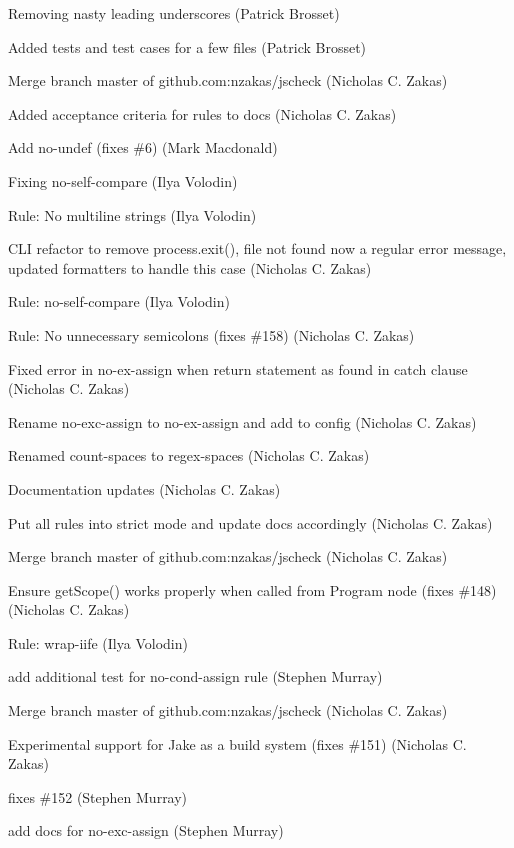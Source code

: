 \begin{DoxyItemize}
\item Removing nasty leading underscores (Patrick Brosset)
\item Added tests and test cases for a few files (Patrick Brosset)
\item Merge branch \textquotesingle{}master\textquotesingle{} of github.\+com\+:nzakas/jscheck (Nicholas C. Zakas)
\item Added acceptance criteria for rules to docs (Nicholas C. Zakas)
\item Add no-\/undef (fixes \#6) (Mark Macdonald)
\item Fixing no-\/self-\/compare (Ilya Volodin)
\item Rule\+: No multiline strings (Ilya Volodin)
\item C\+LI refactor to remove process.\+exit(), file not found now a regular error message, updated formatters to handle this case (Nicholas C. Zakas)
\item Rule\+: no-\/self-\/compare (Ilya Volodin)
\item Rule\+: No unnecessary semicolons (fixes \#158) (Nicholas C. Zakas)
\item Fixed error in no-\/ex-\/assign when return statement as found in catch clause (Nicholas C. Zakas)
\item Rename no-\/exc-\/assign to no-\/ex-\/assign and add to config (Nicholas C. Zakas)
\item Renamed count-\/spaces to regex-\/spaces (Nicholas C. Zakas)
\item Documentation updates (Nicholas C. Zakas)
\item Put all rules into strict mode and update docs accordingly (Nicholas C. Zakas)
\item Merge branch \textquotesingle{}master\textquotesingle{} of github.\+com\+:nzakas/jscheck (Nicholas C. Zakas)
\item Ensure get\+Scope() works properly when called from Program node (fixes \#148) (Nicholas C. Zakas)
\item Rule\+: wrap-\/iife (Ilya Volodin)
\item add additional test for no-\/cond-\/assign rule (Stephen Murray)
\item Merge branch \textquotesingle{}master\textquotesingle{} of github.\+com\+:nzakas/jscheck (Nicholas C. Zakas)
\item Experimental support for Jake as a build system (fixes \#151) (Nicholas C. Zakas)
\item fixes \#152 (Stephen Murray)
\item add docs for no-\/exc-\/assign (Stephen Murray)

\end{DoxyItemize}
